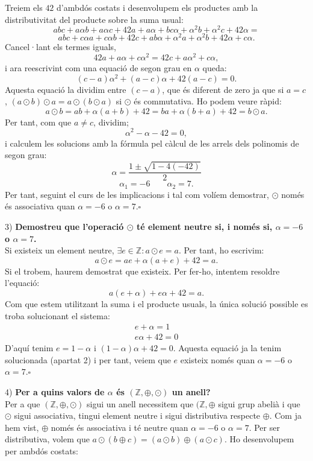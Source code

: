 \documentclass[11pt]{article}
\begin{document}
\begin{legal}
\begin{legal}
$$		$$
		Treiem els $42$ d'ambdós costats i desenvolupem els productes amb la distributivitat del producte sobre la suma usual:
		$$
		abc+a\alpha b+a\alpha c+42a+a\alpha+bc\alpha+\alpha^2b+\alpha^2c+42\alpha=
		$$
		$$
		abc+c\alpha a+c\alpha b+42c+ab\alpha+\alpha^2a+\alpha^2b+42\alpha+c\alpha.
		$$
		Cancel·lant els termes iguals,
		$$
		42a+a\alpha +c\alpha^2=42c+a\alpha^2+c\alpha,
		$$
		i ara reescrivint com una equació de segon grau en $\alpha$ queda:
		$$
		(c-a)\alpha^2+(a-c)\alpha+42(a-c)=0.
		$$
		Aquesta equació la dividim entre $(c-a)$, que és diferent de zero ja que si $a=c$, $(a\odot b)\odot a=a\odot(b\odot a)$ si $\odot$ és commutativa. Ho podem veure ràpid:
		$$a\odot b=ab+\alpha(a+b)+42=ba+\alpha(b+a)+42=b\odot a.$$
		Per tant, com que $a\neq c$, dividim;
		$$
		\alpha^2-\alpha-42=0,
		$$
		i calculem les solucions amb la fórmula pel càlcul de les arrels dels polinomis de segon grau:
		$$
		\alpha=\dfrac{1\pm\sqrt{1-4(-42)}}{2}
		$$
		$$
		\alpha_1=-6\qquad\alpha_2=7.
		$$
		Per tant, seguint el curs de les implicacions i tal com volíem demostrar, $\odot$ només és associativa quan $\alpha=-6$ o $\alpha=7$.$\square$
		\item[3)] \textbf{Demostreu que l'operació $\odot$ té element neutre si, i només si, $\alpha=-6$ o $\alpha=7$.}\\
		Si existeix un element neutre, $\exists e\in\mathbb{Z}:a\odot e=a$. Per tant, ho escrivim:
		$$a\odot e=ae+\alpha(a+e)+42=a.$$
		Si el trobem, haurem demostrat que existeix. Per fer-ho, intentem resoldre l'equació:
		$$a(e+\alpha)+e\alpha+42=a.$$
		Com que estem utilitzant la suma i el producte usuals, la única solució possible es troba solucionant el sistema:
		\[		
		\begin{array}{rcl}
			e+\alpha=1\\
			e\alpha+42=0
		\end{array}
		\]
		D'aquí tenim $e=1-\alpha$ i $(1-\alpha)\alpha+42=0$. Aquesta equació ja la tenim solucionada (apartat 2) i per tant, veiem que $e$ existeix només quan $\alpha=-6$ o $\alpha=7$.$\square$
		\item[4)] \textbf{Per a quins valors de $\alpha$ és $(\mathbb{Z},\oplus,\odot)$ un anell?}\\
		Per a que $(\mathbb{Z},\oplus,\odot)$ sigui un anell necessitem que $(\mathbb{Z},\oplus$ sigui grup abelià i que $\odot$ sigui associativa, tingui element neutre i sigui distributiva respecte $\oplus$. Com ja hem vist, $\oplus$ només és associativa i té neutre quan $\alpha=-6$ o $\alpha=7$. Per ser distributiva, volem que $a\odot(b\oplus c)=(a\odot b)\oplus(a\odot c)$. Ho desenvolupem per ambdós costats:

\end{legal}
\end{legal}
\end{document}

